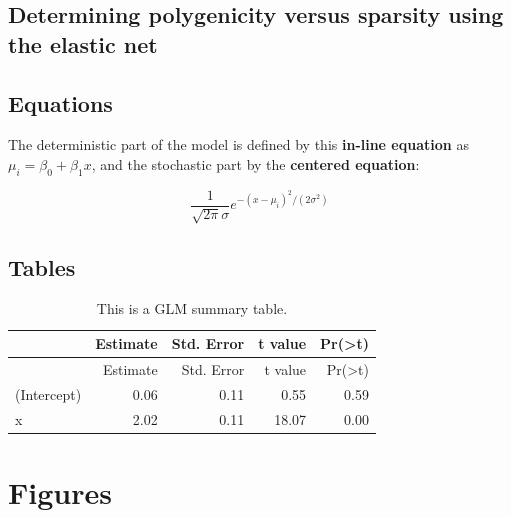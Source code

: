 \documentclass[]{article}
\begin{document}
\subsection{Determining polygenicity versus sparsity using the elastic
net}\label{determining-polygenicity-versus-sparsity-using-the-elastic-net}

\subsection{Equations}\label{equations}

The deterministic part of the model is defined by this \textbf{in-line
equation} as \(\mu_i = \beta_0 + \beta_1x\), and the stochastic part by
the \textbf{centered equation}:

\[ \frac{1}{\sqrt{2\pi}\sigma}e^{-(x-\mu_i)^2/(2\sigma^2)} \]

\subsection{Tables}\label{tables}

\begin{longtable}[c]{@{}lrrrr@{}}
\caption{This is a GLM summary table.}\tabularnewline
\toprule
& Estimate & Std. Error & t value &
Pr(\textgreater{}\textbar{}t\textbar{})\tabularnewline
\midrule
\endfirsthead
\toprule
& Estimate & Std. Error & t value &
Pr(\textgreater{}\textbar{}t\textbar{})\tabularnewline
\midrule
\endhead
(Intercept) & 0.06 & 0.11 & 0.55 & 0.59\tabularnewline
x & 2.02 & 0.11 & 18.07 & 0.00\tabularnewline
\bottomrule
\end{longtable}

\section{Figures}\label{figures}
\end{document}
